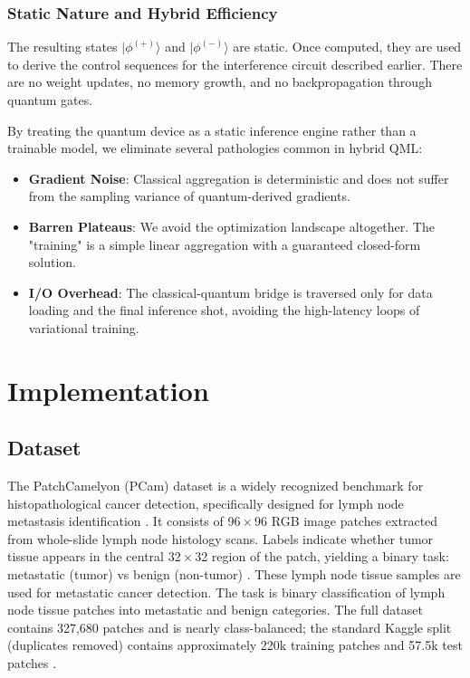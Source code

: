 \documentclass[conference]{IEEEtran}
\begin{document}
\subsubsection{Static Nature and Hybrid Efficiency}
The resulting states $|\phi^{(+)}\rangle$ and $|\phi^{(-)}\rangle$ are static. Once computed, they are used to derive the control sequences for the interference circuit described earlier. There are no weight updates, no memory growth, and no backpropagation through quantum gates.

By treating the quantum device as a static inference engine rather than a trainable model, we eliminate several pathologies common in hybrid QML:
\begin{itemize}
    \item \textbf{Gradient Noise}: Classical aggregation is deterministic and does not suffer from the sampling variance of quantum-derived gradients.
    \item \textbf{Barren Plateaus}: We avoid the optimization landscape altogether. The "training" is a simple linear aggregation with a guaranteed closed-form solution.
    \item \textbf{I/O Overhead}: The classical-quantum bridge is traversed only for data loading and the final inference shot, avoiding the high-latency loops of variational training.
\end{itemize}

\section{Implementation}

\subsection{Dataset}
The PatchCamelyon (PCam) dataset is a widely recognized benchmark for histopathological cancer detection, specifically designed for lymph node metastasis identification \cite{pcam_veeling2018,pcam_01,pcam_03}. It consists of 96\,$\times$\,96 RGB image patches extracted from whole-slide lymph node histology scans. Labels indicate whether tumor tissue appears in the central 32\,$\times$\,32 region of the patch, yielding a binary task: metastatic (tumor) vs benign (non-tumor) \cite{pcam_veeling2018}. These lymph node tissue samples are used for metastatic cancer detection. The task is binary classification of lymph node tissue patches into metastatic and benign categories. The full dataset contains 327{,}680 patches and is nearly class-balanced; the standard Kaggle split (duplicates removed) contains approximately 220k training patches and 57.5k test patches \cite{pcam_veeling2018,pcam_03}.
\end{document}
